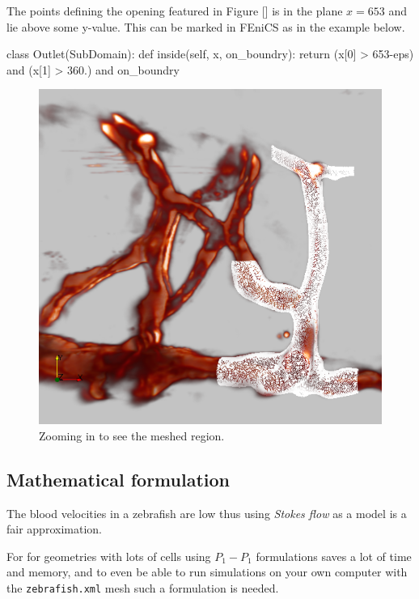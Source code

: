 \documentclass[epsfig,11pt]{article}
\begin{document}
The points defining the opening featured in Figure [] is in the plane $x = 653$ and lie above some y-value. This can be marked in FEniCS as in the example below.

\begin{python}
class Outlet(SubDomain): 
	def inside(self, x, on_boundry):
		return (x[0] > 653-eps) and (x[1] > 360.) and on_boundry
\end{python}


\begin{figure}[h!] 
\begin{center}
  \includegraphics[scale=0.3]{zoomed2.png}
  \end{center}
  \caption{Zooming in to see the meshed region.}
\end{figure}


\subsection{Mathematical formulation}

The blood velocities in a zebrafish are low thus using \emph{Stokes flow} as a model is a fair approximation.

For for geometries with lots of cells using $P_1-P_1$ formulations saves a lot of time and memory, and to even be able to run simulations on your own computer with the \texttt{zebrafish.xml} mesh such a formulation is needed. 
\end{document}
